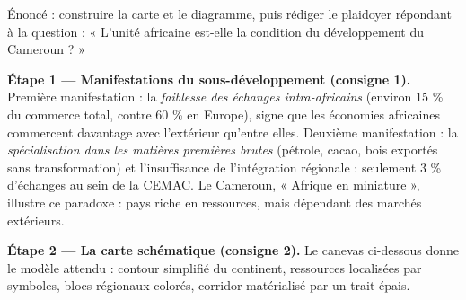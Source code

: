 \documentclass[11pt]{article}
\begin{document}
\begin{exoresolu}
Énoncé : construire la carte et le diagramme, puis rédiger le plaidoyer répondant à la question : « L'unité africaine est-elle la condition du développement du Cameroun ? »

\tcblower

\textbf{Étape 1 — Manifestations du sous-développement (consigne 1).}
Première manifestation : la \emph{faiblesse des échanges intra-africains} (environ 15 \% du commerce total, contre 60 \% en Europe), signe que les économies africaines commercent davantage avec l'extérieur qu'entre elles. Deuxième manifestation : la \emph{spécialisation dans les matières premières brutes} (pétrole, cacao, bois exportés sans transformation) et l'insuffisance de l'intégration régionale : seulement 3 \% d'échanges au sein de la CEMAC. Le Cameroun, « Afrique en miniature », illustre ce paradoxe : pays riche en ressources, mais dépendant des marchés extérieurs.

\textbf{Étape 2 — La carte schématique (consigne 2).} Le canevas ci-dessous donne le modèle attendu : contour simplifié du continent, ressources localisées par symboles, blocs régionaux colorés, corridor matérialisé par un trait épais.


\end{exoresolu}
\end{document}
